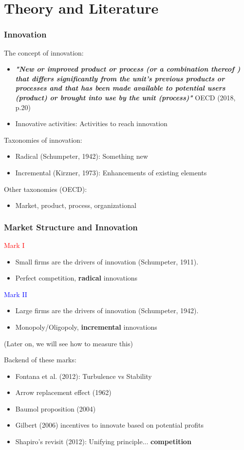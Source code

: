 \documentclass{beamer}
\begin{document}
\section{Theory and Literature}
	\begin{frame}[allowframebreaks]
		\frametitle{Innovation}
		The concept of innovation:
		\begin{itemize}
			\item \textbf{\textit{"New or improved product or process (or a combination thereof ) that differs
			significantly from the unit's previous products or processes and that has been made available to potential users (product) or brought into use by the unit (process)"}} OECD (2018, p.20)
			\item Innovative activities: Activities to reach innovation
		\end{itemize}
		\framebreak
		Taxonomies of innovation:
		\begin{itemize}
			\item Radical (Schumpeter, 1942): Something new 
			\item Incremental (Kirzner, 1973): Enhancements of existing elements 
		\end{itemize}
		Other taxonomies (OECD):
		\begin{itemize}
			\item Market, product, process, organizational
		\end{itemize}
	\end{frame}
	\begin{frame}[allowframebreaks]
		\frametitle{Market Structure and Innovation}
		\textcolor{red}{Mark I}
		\begin{itemize}
			\item Small firms are the drivers of innovation (Schumpeter, 1911).
			\item Perfect competition, \textbf{radical} innovations
		\end{itemize}
		\textcolor{blue}{Mark II}
		\begin{itemize}
			\item Large firms are the drivers of innovation (Schumpeter, 1942).
			\item Monopoly/Oligopoly, \textbf{incremental} innovations
		\end{itemize}	
	(Later on, we will see how to measure this)
		
		\framebreak		
		Backend of these marks:
		\begin{itemize}
			\item Fontana et al. (2012): Turbulence vs Stability
			\item Arrow replacement effect (1962)
			\item Baumol proposition (2004)
			\item Gilbert (2006) incentives to innovate based on potential profits
			\item Shapiro's revisit (2012): Unifying principle... \textbf{competition}
		\end{itemize}	
	\end{frame}
\end{document}
